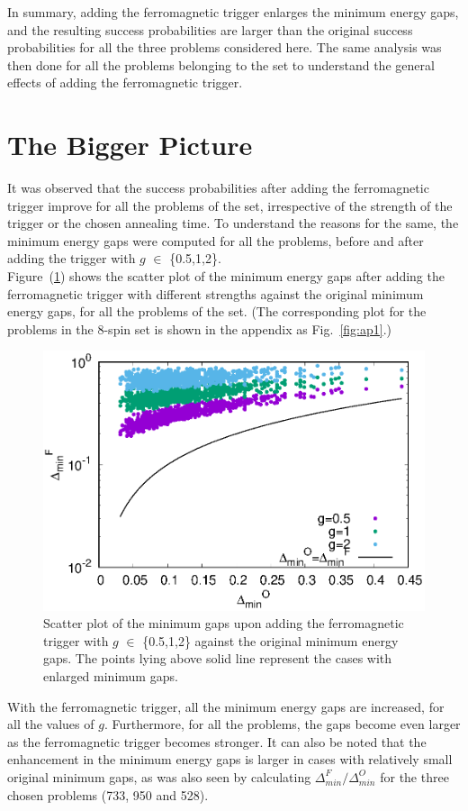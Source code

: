 \documentclass[../main.tex]{subfiles}
\begin{document}
In summary, adding the ferromagnetic trigger enlarges the minimum energy gaps, and the resulting success probabilities are larger than the original success probabilities for all the three problems considered here. The same analysis was then done for all the problems belonging to the set to understand the general effects of adding the ferromagnetic trigger.

\section{The Bigger Picture}
It was observed that the success probabilities after adding the ferromagnetic trigger improve for all the problems of the set, irrespective of the strength of the trigger or the chosen annealing time. To understand the reasons for the same, the minimum energy gaps were computed for all the problems, before and after adding the trigger with $g$ $\in$ \{0.5,1,2\}. \\

Figure~(\ref{fig:f10}) shows the scatter plot of the minimum energy gaps after adding the ferromagnetic trigger with different strengths against the original minimum energy gaps, for all the problems of the set. (The corresponding plot for the problems in the 8-spin set is shown in the appendix as Fig.~\ref{fig:ap1}.)

\begin{figure}[H]
\centering 
\includegraphics[scale=0.8]{Mingap_F_g0_1_2.eps}
\caption{Scatter plot of the minimum gaps upon adding the ferromagnetic trigger with $g$ $\in$ \{0.5,1,2\} against the original minimum energy gaps. The points lying above solid line represent the cases with enlarged minimum gaps.}
\label{fig:f10}
\end{figure}
With the ferromagnetic trigger, all the minimum energy gaps are increased, for  all the values of $g$. Furthermore, for all the problems, the gaps become even larger as the ferromagnetic trigger becomes stronger. It can also be noted that the enhancement in the minimum energy gaps is larger in cases with relatively small original minimum gaps, as was also seen by calculating $\Delta_{min}^F/\Delta_{min}^O$ for the three chosen problems (733, 950 and 528). 
\end{document}

